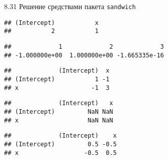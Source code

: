 \begin{solution}{{8.31}}
Решение средствами пакета \verb|sandwich|
\begin{knitrout}
\color{fgcolor}\begin{kframe}
\begin{alltt}
 \hlkwb{<-} \hlstd{(} \hlstd{=} \hlstd{(}\hlstd{,} \hlstd{,} \hlstd{),}  \hlstd{=} \hlstd{(}\hlstd{,} \hlstd{,} \hlstd{))}

 \hlkwb{<-} \hlstd{(}  \hlopt{~} 
\end{alltt}
\begin{verbatim}
## (Intercept)           x
##           2           1
\end{verbatim}
\begin{alltt}
\end{alltt}
\begin{verbatim}
##             1             2             3
## -1.000000e+00  1.000000e+00 -1.665335e-16
\end{verbatim}
\begin{alltt}
\end{alltt}
\begin{verbatim}
##             (Intercept)  x
## (Intercept)           1 -1
## x                    -1  3
\end{verbatim}
\begin{alltt}
 
\end{alltt}
\begin{verbatim}
##             (Intercept)   x
## (Intercept)         NaN NaN
## x                   NaN NaN
\end{verbatim}
\begin{alltt}
  \hlstd{=} \hlstd{)}
\end{alltt}
\begin{verbatim}
##             (Intercept)    x
## (Intercept)         0.5 -0.5
## x                  -0.5  0.5
\end{verbatim}
\begin{alltt}
\end{alltt}
\end{kframe}
\end{knitrout}


\end{solution}
